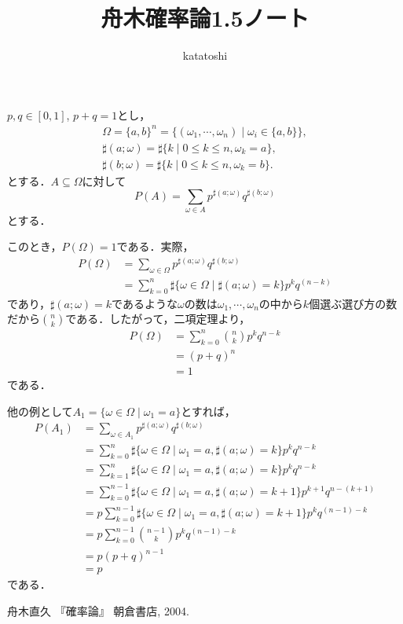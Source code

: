 \documentclass[12pt,a4paper]{jsarticle}
\begin{document}
\title{舟木確率論1.5ノート}
\author{katatoshi}
\maketitle

$p, q \in [0, 1]$, $p + q = 1$とし，　
\begin{gather*}
    \Omega = \{a, b\}^n = \{(\omega_1, \cdots, \omega_n) \mid \omega_i \in \{a, b\}\}, \\
    \sharp(a; \omega) = \sharp\{k \mid 0 \leq k \leq n, \omega_k = a\}, \\
    \sharp(b; \omega) = \sharp\{k \mid 0 \leq k \leq n, \omega_k = b\}.
\end{gather*}
とする．$A \subseteq \Omega$に対して
\begin{equation*}
    P(A) = \sum_{\omega \in A} p^{\sharp(a; \omega)} q^{\sharp(b; \omega)}
\end{equation*}
とする．

このとき，$P(\Omega) = 1$である．実際，
\begin{align*}
    P(\Omega)
    &= \sum_{\omega \in \Omega} p^{\sharp(a; \omega)} q^{\sharp(b; \omega)} \\
    &= \sum_{k = 0}^n \sharp\{\omega \in \Omega \mid \sharp(a; \omega) = k\} p^k q^{(n - k)}
\end{align*}
であり，$\sharp(a; \omega) = k$であるような$\omega$の数は$\omega_1, \cdots, \omega_n$の中から$k$個選ぶ選び方の数だから$\displaystyle \binom{n}{k}$である．したがって，二項定理より，
\begin{align*}
    P(\Omega)
    &= \sum_{k = 0}^n \binom{n}{k} p^k q^{n - k} \\
    &= (p + q)^n \\
    &= 1
\end{align*}
である．

他の例として$A_1 = \{\omega \in \Omega \mid \omega_1 = a\}$とすれば，
\begin{align*}
    P(A_1)
    &= \sum_{\omega \in A_1} p^{\sharp(a; \omega)} q^{\sharp(b; \omega)} \\
    &= \sum_{k = 0}^n \sharp\{\omega \in \Omega \mid \omega_1 = a, \sharp(a; \omega) = k\} p^k q^{n - k} \\
    &= \sum_{k = 1}^n \sharp\{\omega \in \Omega \mid \omega_1 = a, \sharp(a; \omega) = k\} p^k q^{n - k} \\
    &= \sum_{k = 0}^{n - 1} \sharp\{\omega \in \Omega \mid \omega_1 = a, \sharp(a; \omega) = k + 1\} p^{k + 1} q^{n - (k + 1)} \\
    &= p \sum_{k = 0}^{n - 1} \sharp\{\omega \in \Omega \mid \omega_1 = a, \sharp(a; \omega) = k + 1\} p^k q^{(n - 1) - k} \\
    &= p \sum_{k = 0}^{n - 1} \binom{n - 1}{k} p^k q^{(n - 1) - k} \\
    &= p(p + q)^{n - 1} \\
    &= p
\end{align*}
である．

\begin{thebibliography}{99}
    舟木直久
    『確率論』
    朝倉書店, 2004.
\end{thebibliography}
\end{document}
